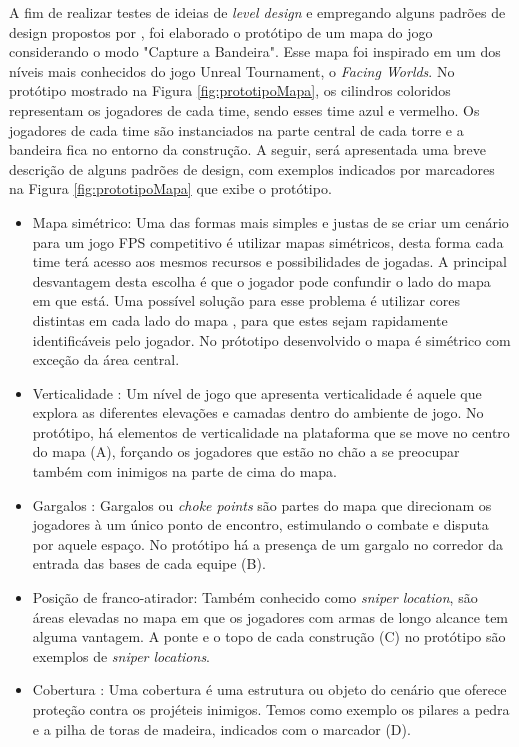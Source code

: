 A fim de realizar testes de ideias de \textit{level design} e empregando alguns padrões de design propostos por \cite{Hullett2010}, foi elaborado o protótipo de um mapa do jogo considerando o modo "Capture a Bandeira". Esse mapa foi inspirado em um dos níveis mais conhecidos do jogo Unreal Tournament, o \textit{Facing Worlds}. No protótipo mostrado na Figura \ref{fig:prototipoMapa}, os cilindros coloridos representam os jogadores de cada time, sendo esses time azul e vermelho. Os jogadores de cada time são instanciados na parte central de cada torre e a bandeira fica no entorno da construção. A seguir, será apresentada uma breve descrição de alguns padrões de design, com exemplos indicados por marcadores na Figura \ref{fig:prototipoMapa} que exibe o protótipo.
\begin{itemize}
    \item Mapa simétrico: Uma das formas mais simples e justas de se criar um cenário para um jogo FPS competitivo é utilizar mapas simétricos, desta forma cada time terá acesso aos mesmos recursos e possibilidades de jogadas. A principal desvantagem desta escolha é que o jogador pode confundir o lado do mapa em que está. Uma possível solução para esse problema é utilizar cores distintas em cada lado do mapa , para que estes sejam rapidamente identificáveis pelo jogador. No prótotipo desenvolvido o mapa é simétrico com exceção da área central.
    \item Verticalidade : Um nível de jogo que apresenta verticalidade é aquele que explora as diferentes elevações e camadas dentro do ambiente de jogo. No protótipo, há elementos de verticalidade na plataforma que se move no centro do mapa (A), forçando os jogadores que estão no chão a se preocupar também com inimigos na parte de cima do mapa.
    \item Gargalos : Gargalos ou \textit{choke points} são partes do mapa que direcionam os jogadores à um único ponto de encontro, estimulando o combate e disputa por aquele espaço. No protótipo há a presença de um gargalo no corredor da entrada das bases de cada equipe (B).
    \item Posição de franco-atirador: Também conhecido como \textit{sniper location}, são áreas elevadas no mapa em que os jogadores com armas de longo alcance tem alguma vantagem. A ponte e o topo de cada construção (C) no protótipo são exemplos de \textit{sniper locations}.
    \item Cobertura : Uma cobertura é uma estrutura ou objeto do cenário que oferece proteção contra os projéteis inimigos. Temos como exemplo os pilares a pedra e a pilha de toras de madeira, indicados com o marcador (D).

\end{itemize}
